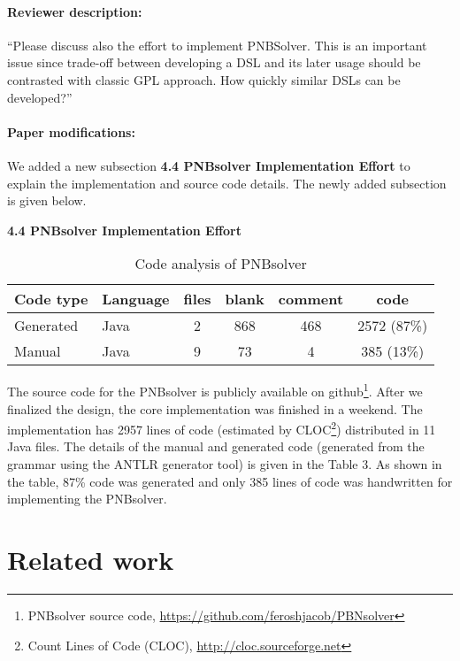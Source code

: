 \documentclass[11pt,a4paper]{article}
\begin{document}
\paragraph{Reviewer description:} ``Please discuss also the effort to implement PNBSolver. This is an important issue since trade-off between developing a DSL and its later usage should be contrasted with classic GPL approach. How quickly similar DSLs can be developed?''
\paragraph{Paper modifications:} We added a new subsection \textbf{4.4 PNBsolver Implementation Effort} to explain the implementation and source code details. The newly added subsection is given below. 

{\it

\textbf{4.4 PNBsolver Implementation Effort}

\begin{table}[h]
\caption{Code analysis of PNBsolver}
\label{code_cloc_analysis}
\centering

\begin{tabular}{|l|l|c|c|c|c|} \hline
Code type & Language &files         & blank        &comment          & code \\\hline
Generated & Java                           &2           & 868 &           468  &         2572 (87\%) \\\hline
Manual &Java &                            9&             73 &             4    &        385 (13\%) \\\hline
\end{tabular}
\end{table}

The source code for the PNBsolver is publicly available on github\footnote{PNBsolver source code, \url{https://github.com/feroshjacob/PBNsolver}}. After we finalized the design, the core implementation was finished in a weekend. 
The implementation has 2957 lines of code (estimated by CLOC\footnote{Count Lines of Code (CLOC), \url{http://cloc.sourceforge.net} }) distributed in 11 Java files. The details of the manual and generated code (generated from the 
grammar using the ANTLR generator tool) is given in the Table 3. As shown in the table, 87\% code was generated and only 385 lines of code was handwritten for implementing the PNBsolver.     



}

\section {Related work}
\end{document}
